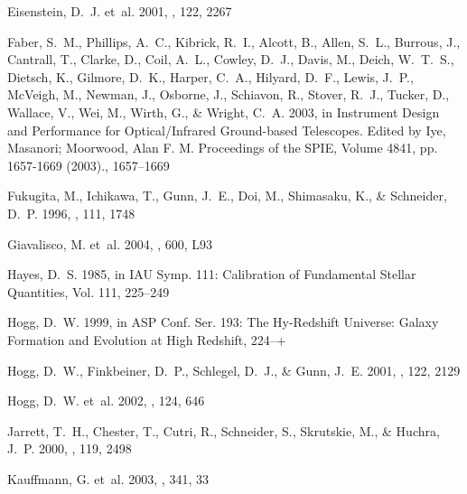 \documentclass[10pt,preprint]{aastex}
\begin{document}
\begin{thebibliography}{39}
Eisenstein, D.~J. {et~al.} 2001, \aj, 122, 2267

{Faber}, S.~M., {Phillips}, A.~C., {Kibrick}, R.~I., {Alcott}, B., {Allen},
  S.~L., {Burrous}, J., {Cantrall}, T., {Clarke}, D., {Coil}, A.~L., {Cowley},
  D.~J., {Davis}, M., {Deich}, W.~T.~S., {Dietsch}, K., {Gilmore}, D.~K.,
  {Harper}, C.~A., {Hilyard}, D.~F., {Lewis}, J.~P., {McVeigh}, M., {Newman},
  J., {Osborne}, J., {Schiavon}, R., {Stover}, R.~J., {Tucker}, D., {Wallace},
  V., {Wei}, M., {Wirth}, G., \& {Wright}, C.~A. 2003, in Instrument Design and
  Performance for Optical/Infrared Ground-based Telescopes. Edited by Iye,
  Masanori; Moorwood, Alan F. M. Proceedings of the SPIE, Volume 4841, pp.
  1657-1669 (2003)., 1657--1669

Fukugita, M., Ichikawa, T., Gunn, J.~E., Doi, M., Shimasaku, K., \& Schneider,
  D.~P. 1996, \aj, 111, 1748

{Giavalisco}, M. {et~al.} 2004, \apjl, 600, L93

{Hayes}, D.~S. 1985, in IAU Symp. 111: Calibration of Fundamental Stellar
  Quantities, Vol. 111, 225--249

{Hogg}, D.~W. 1999, in ASP Conf. Ser. 193: The Hy-Redshift Universe: Galaxy
  Formation and Evolution at High Redshift, 224--+

{Hogg}, D.~W., {Finkbeiner}, D.~P., {Schlegel}, D.~J., \& {Gunn}, J.~E. 2001,
  \aj, 122, 2129

Hogg, D.~W. {et~al.} 2002, \aj, 124, 646

{Jarrett}, T.~H., {Chester}, T., {Cutri}, R., {Schneider}, S., {Skrutskie}, M.,
  \& {Huchra}, J.~P. 2000, \aj, 119, 2498

{Kauffmann}, G. {et~al.} 2003, \mnras, 341, 33


\end{thebibliography}
\end{document}

